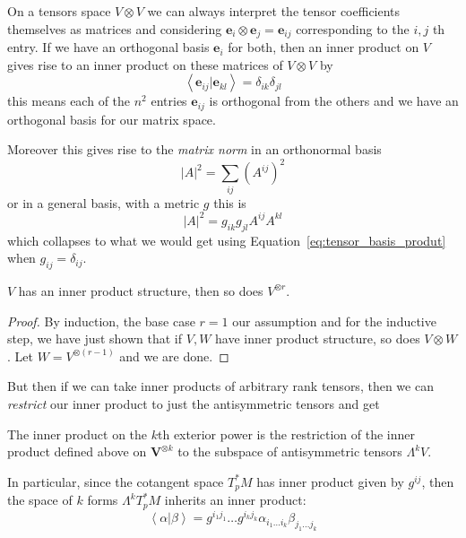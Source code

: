 	\begin{example}
		On a tensors space $V \otimes V$ we can always interpret the tensor coefficients themselves as matrices and considering $\mathbf e_i \otimes \mathbf e_j = \mathbf e_{ij}$ corresponding to the $i,j$ th entry. If we have an orthogonal basis $\mathbf e_i$ for both, then an inner product on $V$ gives rise to an inner product on these matrices of $V \otimes V$ by
		\begin{equation}\label{eq:tensor_basis_produt}
			\left< \mathbf e_{ij} | \mathbf e_{kl} \right> = \delta_{ik} \delta_{jl}
		\end{equation}
		this means each of the $n^2$ entries $\mathbf e_{ij}$ is orthogonal from the others and we have an orthogonal basis for our matrix space.
	\end{example}
	Moreover this gives rise to the \emph{matrix norm} in an orthonormal basis
	\begin{equation}
		|A|^2 = \sum_{ij} (A^{ij})^2
	\end{equation}
	or in a general basis, with a metric $g$ this is 
	\begin{equation}
		|A|^2 = g_{i k} g_{j l} A^{i j} A^{k l}
	\end{equation}
	which collapses to what we would get using Equation~\eqref{eq:tensor_basis_produt} when $g_{ij} = \delta_{ij}$. 
	\begin{prop}
		$V$ has an inner product structure, then so does $V^{\otimes r}$.
	\end{prop}
	\begin{proof}
		By induction, the base case $r=1$ our assumption and for the inductive step, we have just shown that if $V,W$ have inner product structure, so does $V \otimes W$. Let $W = V^{\otimes(r-1)}$ and we are done.
	\end{proof}
	
	But then if we can take inner products of arbitrary rank tensors, then we can \emph{restrict} our inner product to just the antisymmetric tensors and get

	\begin{defn}
		The inner product on the $k$th exterior power is the restriction of the inner product defined above on $\mathbf V^{\otimes k}$ to the subspace of antisymmetric tensors $\Lambda^k V$.
		
		In particular, since the cotangent space $T^*_pM$ has inner product given by $g^{ij}$, then the space of $k$ forms $\Lambda^k T^*_pM$ inherits an inner product:
		\begin{equation}
			\left< \alpha | \beta \right> = g^{i_1 j_1} \dots g^{i_k j_k} \alpha_{i_1\dots i_k} \beta_{j_1 \dots j_k}
		\end{equation}
	\end{defn}
	
